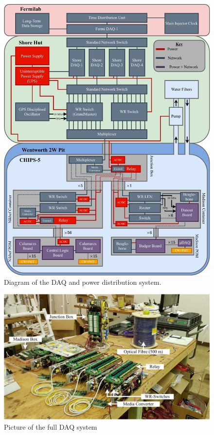 \begin{figure} %
    \includegraphics[width=\textwidth]{diagrams/5-daq/daq.pdf}
    \caption[Diagram of the \chipsfive data acquisition and power distribution system.]
    {Diagram of the \chipsfive DAQ and power distribution system.}
    \label{fig:daq}
\end{figure}

\begin{figure} %
    \includegraphics[width=\textwidth]{diagrams/5-daq/full_setup.pdf}
    \caption[full set up short]
    {Picture of the full \chipsfive DAQ system}
    \label{fig:full_setup}
\end{figure}

